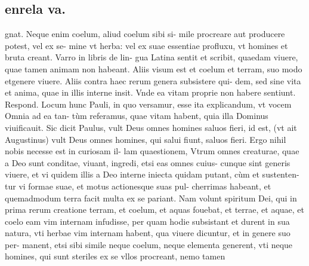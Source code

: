 \documentclass{article}
\begin{document}
\begin{pages}
\section*{enrela va. }
\marginpar{[ p.471 ]}\pstart gnat. Neque enim coelum, aliud coelum sibi si- mile procreare aut producere potest, vel ex se- mine vt herba: vel ex suae essentiae profluxu, vt homines et bruta creant. Varro in libris de lin- gua Latina sentit et scribit, quaedam viuere, quae tamen animam non habeant. Aliis visum est et coelum et terram, suo modo etgenere viuere. Aliis contra haec rerum genera subsistere qui- dem, sed sine vita et anima, quae in illis interne insit. Vnde ea vitam proprie non habere sentiunt. Respond. Locum hunc Pauli, in quo versamur, esse ita explicandum, vt vocem Omnia ad ea tan- tùm referamus, quae vitam habent, quia illa Dominus viuificauit. Sic dicit Paulus, vult Deus omnes homines saluos fieri, id est, (vt ait Augustinus) vult Deus omnes homines, qui salui fiunt, saluos fieri. Ergo nihil nobis necesse est in curiosam il- lam quaestionem, Vtrum omnes creaturae, quae a Deo sunt conditae, viuant, ingredi, etsi eas omnes cuius- cunque sint generis viuere, et vi quidem illis a Deo interne iniecta quidam putant, cùm et sustenten- tur vi formae suae, et motus actionesque suas pul- cherrimas habeant, et quemadmodum terra facit multa ex se pariant. Nam volunt spiritum Dei, qui in prima rerum creatione terram, et coelum, et aquas fouebat, et terrae, et aquae, et coelo eam vim internam infudisse, per quam hodie subsistant et durent in sua natura, vti herbae vim internam habent, qua viuere dicuntur, et in genere suo per- manent, etsi sibi simile neque coelum, neque elementa generent, vti neque homines, qui sunt steriles ex se vllos procreant, nemo tamen  \pend

\end{pages}
\end{document}
